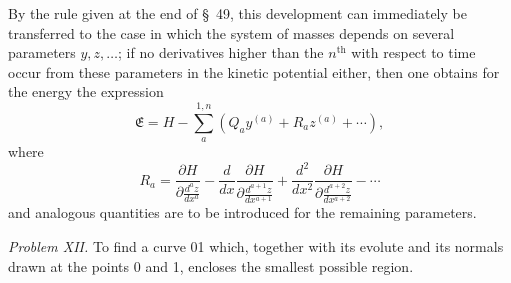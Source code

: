 \documentclass[11pt,a4paper,leqno]{article}
\begin{document}
By the rule given at the end of \S~49, this development can immediately be transferred to the case in which the system of masses depends on several parameters $y,z,\ldots$; if no derivatives higher than the $n^{\mathrm{th}}$ with respect to time occur from these parameters in the kinetic potential either, then one obtains for the energy the expression
\[
\mathfrak E=H-\sum_a^{1,n}(Q_ay^{(a)}+R_az^{(a)}+\cdots),
\]
where
\[
R_a=\frac{\partial H}{\partial\frac{d^az}{dx^a}}-\frac{d}{dx}\frac{\partial H}{\partial\frac{d^{a+1}z}{dx^{a+1}}}+\frac{d^2}{dx^2}\frac{\partial H}{\partial\frac{d^{a+2}z}{dx^{a+2}}}-\cdots
\]
and analogous quantities are to be introduced for the remaining parameters.

\emph{Problem XII.} To find a curve 01 which, together with its evolute and its normals drawn at the points 0 and 1, encloses the smallest possible region.
\end{document}
